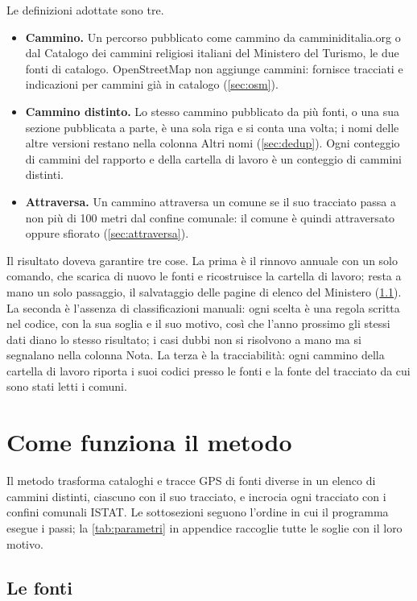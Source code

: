 Le definizioni adottate sono tre.

\begin{itemize}
\item \textbf{Cammino.} Un percorso pubblicato come cammino da camminiditalia.org o dal Catalogo dei cammini religiosi italiani del Ministero del Turismo, le due fonti di catalogo. OpenStreetMap non aggiunge cammini: fornisce tracciati e indicazioni per cammini già in catalogo (\cref{sec:osm}).
\item \textbf{Cammino distinto.} Lo stesso cammino pubblicato da più fonti, o una sua sezione pubblicata a parte, è una sola riga e si conta una volta; i nomi delle altre versioni restano nella colonna Altri nomi (\cref{sec:dedup}). Ogni conteggio di cammini del rapporto e della cartella di lavoro è un conteggio di cammini distinti.
\item \textbf{Attraversa.} Un cammino attraversa un comune se il suo tracciato passa a non più di 100 metri dal confine comunale: il comune è quindi attraversato oppure sfiorato (\cref{sec:attraversa}).
\end{itemize}

Il risultato doveva garantire tre cose. La prima è il rinnovo annuale con un solo comando, che scarica di nuovo le fonti e ricostruisce la cartella di lavoro; resta a mano un solo passaggio, il salvataggio delle pagine di elenco del Ministero (\cref{sec:fonti}). La seconda è l'assenza di classificazioni manuali: ogni scelta è una regola scritta nel codice, con la sua soglia e il suo motivo, così che l'anno prossimo gli stessi dati diano lo stesso risultato; i casi dubbi non si risolvono a mano ma si segnalano nella colonna Nota. La terza è la tracciabilità: ogni cammino della cartella di lavoro riporta i suoi codici presso le fonti e la fonte del tracciato da cui sono stati letti i comuni.

\section{Come funziona il metodo}\label{sec:metodo}

Il metodo trasforma cataloghi e tracce GPS di fonti diverse in un elenco di cammini distinti, ciascuno con il suo tracciato, e incrocia ogni tracciato con i confini comunali ISTAT. Le sottosezioni seguono l'ordine in cui il programma esegue i passi; la \cref{tab:parametri} in appendice raccoglie tutte le soglie con il loro motivo.

\subsection{Le fonti}\label{sec:fonti}

